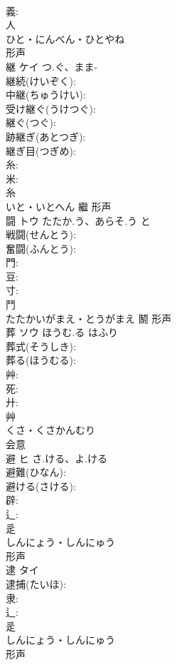 \documentclass[8pt]{extreport}
\begin{document}
\begin{CJK}{UTF8}{min}
\\	義: 
\\	人	
\\	ひと・にんべん・ひとやね	
\\	形声 
\\	継	ケイ	つ.ぐ、まま-		
\\	継続(けいぞく): 
\\	中継(ちゅうけい): 
\\	受け継ぐ(うけつぐ): 
\\	継ぐ(つぐ): 
\\	跡継ぎ(あとつぎ): 
\\	継ぎ目(つぎめ): 
\\	糸: 
\\	米: 
\\	糸	
\\	いと・いとへん	繼	形声 
\\	闘	トウ	たたか.う、あらそ.う	と	
\\	戦闘(せんとう): 
\\	奮闘(ふんとう): 
\\	門: 
\\	豆: 
\\	寸: 
\\	鬥	
\\	たたかいがまえ・とうがまえ	鬭	形声 
\\	葬	ソウ	ほうむ.る	はふり	
\\	葬式(そうしき): 
\\	葬る(ほうむる): 
\\	艸: 
\\	死: 
\\	廾: 
\\	艸	
\\	くさ・くさかんむり	
\\	会意 
\\	避	ヒ	さ.ける、よ.ける		
\\	避難(ひなん): 
\\	避ける(さける): 
\\	辟: 
\\	辶: 
\\	辵	
\\	しんにょう・しんにゅう	
\\	形声 
\\	逮	タイ			
\\	逮捕(たいほ): 
\\	隶: 
\\	辶: 
\\	辵	
\\	しんにょう・しんにゅう	
\\	形声 

\end{CJK}
\end{document}

